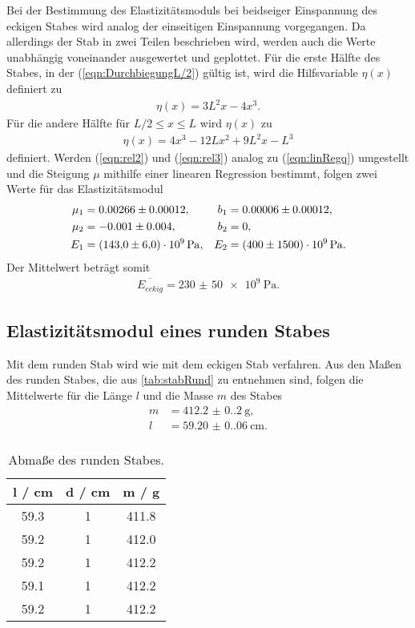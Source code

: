 Bei der Bestimmung des Elastizitätsmoduls bei beidseiger Einspannung des eckigen Stabes wird analog der einseitigen Einspannung vorgegangen.
Da allerdings der Stab in zwei Teilen beschrieben wird, werden auch die Werte unabhängig voneinander ausgewertet und geplottet.
Für die erste Hälfte des Stabes, in der (\ref{eqn:DurchbiegungL/2}) gültig ist, wird die Hilfsvariable $\eta(x)$ definiert zu
\begin{align}
  \eta(x) = 3L^2x-4x^3.
  \label{eqn:rel2}
\end{align}
Für die andere Hälfte für $L/2 \leq x \leq L$ wird $\eta(x)$ zu 
\begin{align}
  \eta(x) = 4x^3 - 12L x^2+9L^2x-L^3
  \label{eqn:rel3}
\end{align}
definiert. Werden (\ref{eqn:rel2}) und (\ref{eqn:rel3}) analog zu (\ref{eqn:linRegq}) umgestellt und die Steigung $\mu$ mithilfe einer
linearen Regression bestimmt, folgen zwei Werte für das Elastizitätsmodul
\begin{align*}
  \mu_1&= 0.00266 \pm 0.00012, & b_1 &= 0.00006 \pm 0.00012, \\
  \mu_2 &= -0.001 \pm 0.004, & b_2 &= 0, \\
  E_1 &= \SI{143.0(6.0)e9}{\Pa}, & E_2 &= \SI{400 (1500)e9}{\Pa}.    
\end{align*}
Der Mittelwert beträgt somit
\begin{align*}
  \overline{E_{eckig}} = \SI{230(50)e9}{\Pa}.
\end{align*}

\subsection{Elastizitätsmodul eines runden Stabes}
\label{sec:elastiRund}

\sloppy
Mit dem runden Stab wird wie mit dem eckigen Stab verfahren. Aus den Maßen des runden Stabes, die aus \autoref{tab:stabRund}
zu entnehmen sind, folgen die Mittelwerte für die Länge $l$ und die Masse $m$ des Stabes
\begin{align*}
  m &= \SI{412.2(0.2)}{\gram}, \\
  l &= \SI{59.20(0.06)}{\cm}. \\
\end{align*}

\sloppy
\begin{table}[H]
  \centering
  \caption{Abmaße des runden Stabes.}
  \label{tab:stabRund}
  \begin{tabular}{c c c}
    \toprule
    l / cm & d / cm & m / g \\
    \midrule
    59.3 & 1 & 411.8 \\
    59.2 & 1 & 412.0 \\
    59.2 & 1 & 412.2 \\
    59.1 & 1 & 412.2 \\
    59.2 & 1 & 412.2 \\
    \bottomrule
  \end{tabular}
\end{table}

